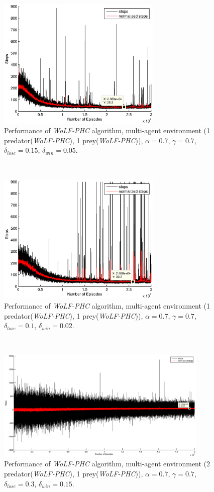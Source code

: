 \documentclass[a4paper,11pt]{article}
\begin{document}
~
\begin{figure}[ht!]
  \centering
    \includegraphics[width=0.7\textwidth]{figures/w0707015005.eps}
        \caption{Performance of  \textit{WoLF-PHC} algorithm, multi-agent environment (1 predator(\textit{WoLF-PHC}), 1 prey(\textit{WoLF-PHC})), $\alpha = 0.7$, $\gamma = 0.7$, $\delta_{lose} = 0.15$, $\delta_{win} = 0.05$.}
    \label{w113}
\end{figure}
~
\begin{figure}[ht!]
  \centering
    \includegraphics[width=0.7\textwidth]{figures/w070701002.eps}
        \caption{Performance of  \textit{WoLF-PHC} algorithm, multi-agent environment (1 predator(\textit{WoLF-PHC}), 1 prey(\textit{WoLF-PHC})), $\alpha = 0.7$, $\gamma = 0.7$, $\delta_{lose} = 0.1$, $\delta_{win} = 0.02$.}
    \label{w114}
\end{figure}
~
\begin{figure}[ht!]
  \centering
    \includegraphics[width=0.9\textwidth]{figures/w2.eps}
        \caption{Performance of  \textit{WoLF-PHC} algorithm, multi-agent environment (2 predator(\textit{WoLF-PHC}), 1 prey(\textit{WoLF-PHC})), $\alpha = 0.7$, $\gamma = 0.7$, $\delta_{lose} = 0.3$, $\delta_{win} = 0.15$.}
    \label{w2}
\end{figure}
\end{document}
